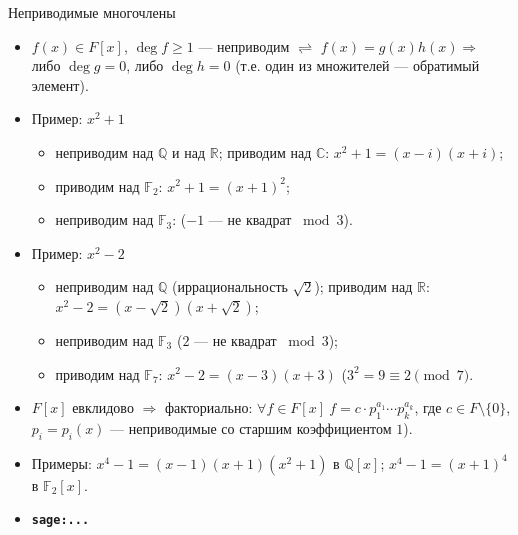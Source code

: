 \documentclass[serif, aspectratio=169]{beamer}
\newcommand{\sagemark}{%
  \textcolor{green!40!black}{\textbf{\texttt{sage:...}}}%
}
\begin{document}
\begin{frame}{Неприводимые многочлены}
    \begin{itemize}
        \item $f(x)\in F[x]$, $\deg f\ge1$ --- неприводим $\rightleftharpoons$ $f(x)=g(x)h(x) \Rightarrow$ либо $\deg g=0$, либо $\deg h=0$ (т.е. один из множителей --- обратимый элемент).
        \item Пример: $x^2+1$
        \begin{itemize}
            \item неприводим над $\mathbb{Q}$ и над $\mathbb{R}$; приводим над $\mathbb{C}$: $x^2+1 = (x-i)(x+i)$;
            \item приводим над $\mathbb{F}_2$: $x^2+1 = (x+1)^2$;
            \item неприводим над $\mathbb{F}_3$: ($-1$ --- не квадрат $ \bmod 3$).
        \end{itemize}
        \item Пример: $x^2-2$
        \begin{itemize}
            \item неприводим над $\mathbb{Q}$ (иррациональность $\sqrt2$); приводим над $\mathbb{R}$: $x^2-2 = (x-\sqrt2)(x+\sqrt2)$;
            \item неприводим над $\mathbb{F}_3$ ($2$ --- не квадрат $\bmod 3$);
            \item приводим над $\mathbb{F}_7$: $x^2-2=(x-3)(x+3)$ ($3^2=9\equiv2 \pmod{7}$.
        \end{itemize}
        \item $F[x]$ евклидово $\Rightarrow$ факториально: $\forall f\in F[x]\ f=c\cdot p_1^{a_1}\cdots p_k^{a_k}$, где $c\in F\setminus{\{0\}}$, $p_i=p_i(x)$ --- неприводимые со старшим коэффициентом $1$).
        \item Примеры: $x^4-1=(x-1)(x+1)(x^2+1)$ в $\mathbb{Q}[x]$; $x^4-1=(x+1)^4$ в $\mathbb{F}_2[x]$.
        \item \sagemark
    \end{itemize}
\end{frame}
\end{document}
